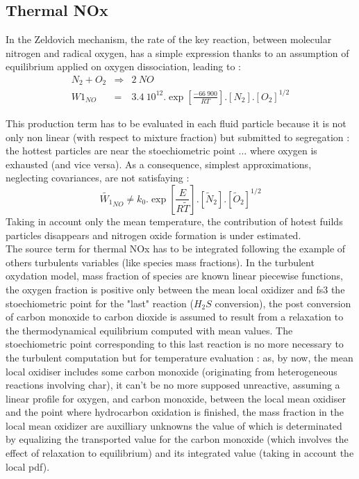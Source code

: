 \subsection*{Thermal NOx}
In the Zeldovich mechanism, the rate of the key reaction, between molecular
nitrogen and radical oxygen, has a simple expression thanks to an assumption of
equilibrium applied on oxygen dissociation, leading to :
\begin{eqnarray}
 N_{2} + O_{2} &\Rightarrow& 2 ~NO \nonumber \\
 W1_{NO}&=& 3.4\medspace10^{12}  .   \exp \left[\frac{-66\medspace900}{RT}\right].\left[ N_{2} \right] . \left[O_{2}\right]^{1/2}
\end{eqnarray} 
 
This production term has to be evaluated in each fluid particle because it is not
only non linear (with respect to mixture fraction) but submitted to segregation :
the hottest particles are near the stoechiometric point ... where oxygen is
exhausted (and vice versa). As a consequence, simplest approximations, neglecting
covariances, are not satisfaying :\\

\begin{equation}
 \widetilde{W_1}_{NO} \neq k_0  . \exp \left[\frac{E}{R\tilde{T}}\right].\left[ \widetilde{N}_{2} \right].\left[\widetilde{O}_{2}\right]^{1/2}
\end{equation}
Taking in account only the mean temperature, the contribution of hotest fuilds particles disappears and nitrogen oxide formation is under estimated.\\
The source term for thermal NOx has to be integrated following the example of
others turbulents variables (like species mass fractions). In the turbulent
oxydation model, mass fraction of species are known linear piecewise functions,
the oxygen fraction is positive only between the mean local oxidizer and fs3 the
stoechiometric point for the "last" reaction ($H_{2}S$ conversion), the post
conversion of carbon monoxide to carbon dioxide is assumed to result from a
relaxation to the thermodynamical equilibrium computed with mean values. The
stoechiometric point corresponding to this last reaction is no more necessary to
the turbulent computation but for temperature evaluation : as, by now, the mean
local oxidiser includes some carbon monoxide (originating from heterogeneous
reactions involving char), it can't be no more supposed unreactive, assuming a
linear profile for oxygen, and carbon monoxide, between the local mean oxidiser
and the point where hydrocarbon oxidation is finished, the mass fraction in the
local mean oxidizer are auxilliary unknowns the value of which is determinated
by equalizing the transported value for the carbon monoxide (which involves the
effect of relaxation to equilibrium) and its integrated value (taking in account
the local pdf).
   

